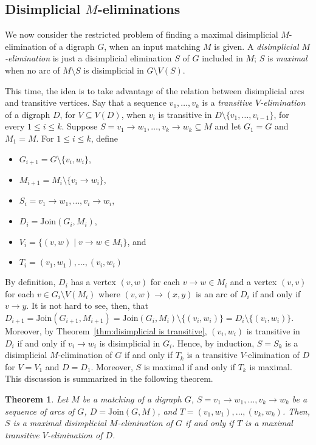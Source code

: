 \documentclass[a4paper,11pt]{article}
\newtheorem{theorem}{Theorem}
\newcommand{\JOIN}{\ensuremath{\mathrm{Join}}}
\begin{document}
\subsection{Disimplicial $M$-eliminations}

We now consider the restricted problem of finding a maximal disimplicial $M$-elimination of a digraph $G$, when an input matching $M$ is given.  A \emph{disimplicial $M$-elimination} is just a disimplicial elimination $S$ of $G$ included in $M$; $S$ is \emph{maximal} when no arc of $M \setminus S$ is disimplicial in $G \setminus V(S)$.  

This time, the idea is to take advantage of the relation between disimplicial arcs and transitive vertices.  Say that a sequence $v_1, \ldots, v_k$ is a \emph{transitive $V$-elimination} of a digraph $D$, for $V \subseteq V(D)$, when $v_i$ is transitive in $D \setminus \{v_1, \ldots, v_{i-1}\}$, for every $1 \leq i \leq k$.  Suppose $S = v_1 \to w_1 , \ldots, v_k \to w_k \subseteq M$ and let $G_1 = G$ and $M_1 = M$.  For $1 \leq i \leq k$, define
\begin{itemize}
\item $G_{i+1} = G \setminus \{v_i, w_i\}$,
\item $M_{i+1} = M_{i} \setminus \{v_i \to w_i\}$,
\item $S_i = v_1 \to w_1 , \ldots, v_i \to w_i$,
\item $D_i = \JOIN(G_i, M_i)$, 
\item $V_i = \{(v, w) \mid v \to w \in M_i\}$, and
\item $T_i = (v_1, w_1) , \ldots, (v_i, w_i)$
\end{itemize}
By definition, $D_i$ has a vertex $(v,w)$ for each $v \to w \in M_i$ and a vertex $(v,v)$ for each $v \in G_i \setminus V(M_i)$ where $(v, w) \to (x,y)$ is an arc of $D_i$ if and only if $v \to y$.  It is not hard to see, then, that $D_{i+1} = \JOIN(G_{i+1}, M_{i+1}) = \JOIN(G_i, M_i) \setminus \{(v_i, w_i)\} = D_i \setminus \{(v_i, w_i)\}$.  Moreover, by Theorem~\ref{thm:disimplicial is transitive}, $(v_i, w_i)$ is transitive in $D_i$ if and only if $v_i \to w_i$ is disimplicial in $G_{i}$.  Hence, by induction, $S = S_k$ is a disimplicial $M$-elimination of $G$ if and only if $T_k$ is a transitive $V$-elimination of $D$ for $V = V_1$ and $D = D_1$.  Moreover, $S$ is maximal if and only if $T_k$ is maximal.  This discussion is summarized in the following theorem.

\begin{theorem}\label{thm:transitive elimination}
  Let $M$ be a matching of a digraph $G$, $S = v_1 \to w_1, \ldots, v_k \to w_k$ be a sequence of arcs of $G$, $D = \JOIN(G, M)$, and $T = (v_1, w_1) , \ldots, (v_k, w_k)$.  Then, $S$ is a maximal disimplicial $M$-elimination of $G$ if and only if $T$ is a maximal transitive $V$-elimination of $D$. 
\end{theorem}
\end{document}

